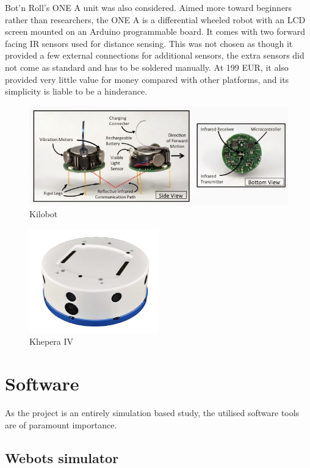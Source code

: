 Bot'n Roll's ONE A unit was also considered. Aimed more toward beginners rather than researchers, the ONE A is a differential wheeled robot with an LCD screen mounted on an Arduino programmable board. It comes with two forward facing IR sensors used for distance sensing. \cite{onea} This was not chosen as though it provided a few external connections for additional sensors, the extra sensors did not come as standard and has to be soldered manually. At 199 EUR, it also provided very little value for money compared with other platforms, and its simplicity is liable to be a hinderance.
\begin{figure}[h]
	\centering
	\includegraphics[width=1\textwidth]{kilobots}
	\caption{\label{fig:kilobot}Kilobot}
\end{figure}

\begin{figure}[h]
	\centering
	\includegraphics[width=0.5\textwidth]{khepera}
	\caption{\label{fig:khepera}Khepera IV}
\end{figure}
\clearpage

\section{Software}

As the project is an entirely simulation based study, the utilised software tools are of paramount importance. 

\subsection{Webots simulator}
\label{webots}

